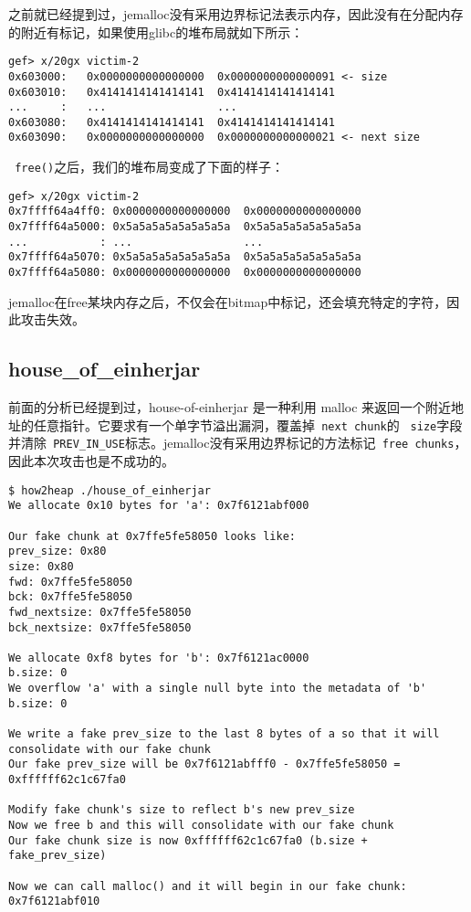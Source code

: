 之前就已经提到过，jemalloc没有采用边界标记法表示内存，因此没有在分配内存的附近有标记，如果使用glibc的堆布局就如下所示：
\begin{verbatim}
gef> x/20gx victim-2
0x603000:   0x0000000000000000  0x0000000000000091 <- size
0x603010:   0x4141414141414141  0x4141414141414141
...     :   ...                 ...
0x603080:   0x4141414141414141  0x4141414141414141
0x603090:   0x0000000000000000  0x0000000000000021 <- next size
\end{verbatim}

\verb+ free()+之后，我们的堆布局变成了下面的样子：
\begin{verbatim}
gef> x/20gx victim-2
0x7ffff64a4ff0: 0x0000000000000000  0x0000000000000000
0x7ffff64a5000: 0x5a5a5a5a5a5a5a5a  0x5a5a5a5a5a5a5a5a
...           : ...                 ...
0x7ffff64a5070: 0x5a5a5a5a5a5a5a5a  0x5a5a5a5a5a5a5a5a
0x7ffff64a5080: 0x0000000000000000  0x0000000000000000
\end{verbatim}

jemalloc在free某块内存之后，不仅会在bitmap中标记，还会填充特定的字符，因此攻击失效。

\subsection{house\_of\_einherjar}

前面的分析已经提到过，house-of-einherjar 是一种利用 malloc 来返回一个附近地址的任意指针。它要求有一个单字节溢出漏洞，覆盖掉\verb+ next chunk+的 \verb+ size+字段并清除\verb+ PREV_IN_USE+标志。jemalloc没有采用边界标记的方法标记\verb+ free chunks+，因此本次攻击也是不成功的。
\begin{verbatim}
$ how2heap ./house_of_einherjar
We allocate 0x10 bytes for 'a': 0x7f6121abf000

Our fake chunk at 0x7ffe5fe58050 looks like:
prev_size: 0x80
size: 0x80
fwd: 0x7ffe5fe58050
bck: 0x7ffe5fe58050
fwd_nextsize: 0x7ffe5fe58050
bck_nextsize: 0x7ffe5fe58050

We allocate 0xf8 bytes for 'b': 0x7f6121ac0000
b.size: 0
We overflow 'a' with a single null byte into the metadata of 'b'
b.size: 0

We write a fake prev_size to the last 8 bytes of a so that it will consolidate with our fake chunk
Our fake prev_size will be 0x7f6121abfff0 - 0x7ffe5fe58050 = 0xffffff62c1c67fa0

Modify fake chunk's size to reflect b's new prev_size
Now we free b and this will consolidate with our fake chunk
Our fake chunk size is now 0xffffff62c1c67fa0 (b.size + fake_prev_size)

Now we can call malloc() and it will begin in our fake chunk: 0x7f6121abf010
\end{verbatim}

